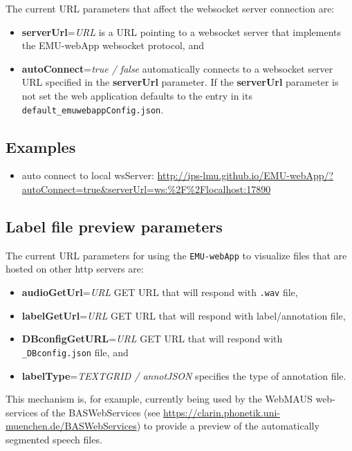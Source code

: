 \documentclass[]{book}
\providecommand{\tightlist}{%
  \setlength{\itemsep}{0pt}\setlength{\parskip}{0pt}}
\begin{document}
The current URL parameters that affect the websocket server connection are:

\begin{itemize}
\tightlist
\item
  \textbf{serverUrl}=\emph{URL} is a URL pointing to a websocket server that implements the EMU-webApp websocket protocol, and
\item
  \textbf{autoConnect}=\emph{true / false} automatically connects to a websocket server URL specified in the \textbf{serverUrl} parameter. If the \textbf{serverUrl} parameter is not set the web application defaults to the entry in its \texttt{default\_emuwebappConfig.json}.
\end{itemize}

\hypertarget{examples}{%
\subsection{Examples}\label{examples}}

\begin{itemize}
\tightlist
\item
  auto connect to local wsServer: \url{http://ips-lmu.github.io/EMU-webApp/?autoConnect=true\&serverUrl=ws:\%2F\%2Flocalhost:17890}
\end{itemize}

\hypertarget{label-file-preview-parameters}{%
\subsection{Label file preview parameters}\label{label-file-preview-parameters}}

The current URL parameters for using the \texttt{EMU-webApp} to visualize files that are hosted on other http servers are:

\begin{itemize}
\tightlist
\item
  \textbf{audioGetUrl}=\emph{URL} GET URL that will respond with \texttt{.wav} file,
\item
  \textbf{labelGetUrl}=\emph{URL} GET URL that will respond with label/annotation file,
\item
  \textbf{DBconfigGetURL}=\emph{URL} GET URL that will respond with \texttt{\_DBconfig.json} file, and
\item
  \textbf{labelType}=\emph{TEXTGRID / annotJSON} specifies the type of annotation file.
\end{itemize}

This mechanism is, for example, currently being used by the WebMAUS web-services of the BASWebServices (see \url{https://clarin.phonetik.uni-muenchen.de/BASWebServices}) to provide a preview of the automatically segmented speech files.
\end{document}
